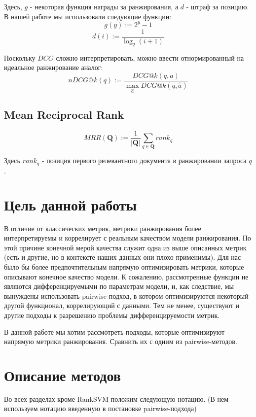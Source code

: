 \documentclass{article}[16pt]
\begin{document}
	Здесь, $g$ - некоторая функция награды за ранжирования, а $d$ - штраф за позицию. В нашей работе мы использовали следующие функции:
	\begin{equation*}
		g(y) := 2^y - 1
	\end{equation*}
	\begin{equation*}
		d(i) := \frac1{\log_2 (i + 1)}
	\end{equation*}
	
	Поскольку $DCG$ сложно интерпретировать, можно ввести отнормированный на идеальное ранжирование аналог:
	\begin{equation}
		nDCG@k(q) := \frac{DCG@k(q, a)}{\max_{\hat{a}} DCG@k(q, \hat{a})}
	\end{equation}
	
	\subsection{Mean Reciprocal Rank}
	\begin{equation}
		MRR(\mathbf{Q}) := \frac1{|\mathbf{Q}|}\sum_{q \in \mathbf{Q}} rank_q
	\end{equation}
	
	Здесь $rank_q$ - позиция первого релевантного документа в ранжировании запроса $q$.
	\section{Цель данной работы}
	В отличие от классических метрик, метрики ранжирования более интерпретируемы и коррелирует с реальным качеством модели ранжирования. По этой причине конечной мерой качества служит одна из выше описанных метрик (есть и другие, но в контексте наших данных они плохо применимы). Для нас было бы более предпочтительным напрямую оптимизировать метрики, которые описывают конечное качество модели. К сожалению, рассмотренные функции не являются дифференцируемыми по параметрам модели, и, как следствие, мы вынуждены использовать pairwise-подход, в котором оптимизируются некоторый другой функционал, коррелирующий с данными. Тем не менее, существуют и другие подходы к разрешению проблемы дифференцируемости метрик.
	
	В данной работе мы хотим рассмотреть подходы, которые оптимизируют напрямую метрики ранжирования. Сравнить их с одним из pairwise-методов.
	
	\section{Описание методов}
	Во всех разделах кроме RankSVM положим следующую нотацию. (В нем используем нотацию введенную в постановке pairwise-подхода)
	
\end{document}
